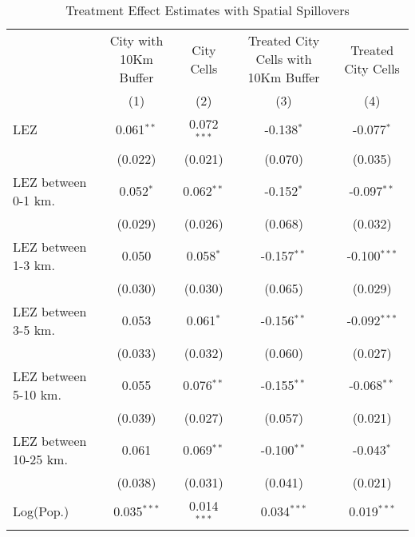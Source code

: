 
\begin{table}[htbp]
   \caption{\label{tab:te_spillovers} Treatment Effect Estimates with Spatial Spillovers}
   \centering
   \small
   \begin{tabular}{lcccc}
      \tabularnewline \midrule \midrule
                            & City with 10Km Buffer & City Cells    & Treated City Cells with 10Km Buffer & Treated City Cells \\   
                            & (1)                   & (2)           & (3)                                 & (4)\\  
      LEZ                   & 0.061$^{**}$          & 0.072$^{***}$ & -0.138$^{*}$                        & -0.077$^{*}$\\   
                            & (0.022)               & (0.021)       & (0.070)                             & (0.035)\\   
      LEZ between 0-1 km.   & 0.052$^{*}$           & 0.062$^{**}$  & -0.152$^{*}$                        & -0.097$^{**}$\\   
                            & (0.029)               & (0.026)       & (0.068)                             & (0.032)\\   
      LEZ between 1-3 km.   & 0.050                 & 0.058$^{*}$   & -0.157$^{**}$                       & -0.100$^{***}$\\   
                            & (0.030)               & (0.030)       & (0.065)                             & (0.029)\\   
      LEZ between 3-5 km.   & 0.053                 & 0.061$^{*}$   & -0.156$^{**}$                       & -0.092$^{***}$\\   
                            & (0.033)               & (0.032)       & (0.060)                             & (0.027)\\   
      LEZ between 5-10 km.  & 0.055                 & 0.076$^{**}$  & -0.155$^{**}$                       & -0.068$^{**}$\\   
                            & (0.039)               & (0.027)       & (0.057)                             & (0.021)\\   
      LEZ between 10-25 km. & 0.061                 & 0.069$^{**}$  & -0.100$^{**}$                       & -0.043$^{*}$\\   
                            & (0.038)               & (0.031)       & (0.041)                             & (0.021)\\   
      Log(Pop.)             & 0.035$^{***}$         & 0.014$^{***}$ & 0.034$^{***}$                       & 0.019$^{***}$\\   

\end{tabular}
\end{table}
